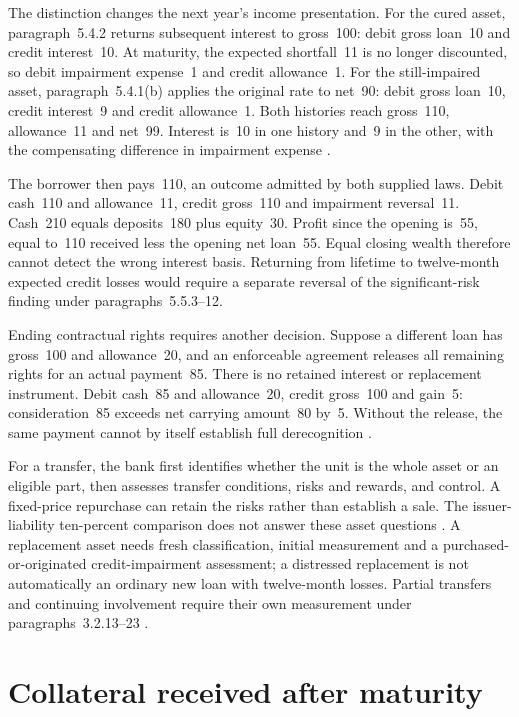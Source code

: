 The distinction changes the next year's income presentation. For the cured
asset, paragraph~5.4.2 returns subsequent interest to gross~100: debit gross
loan~10 and credit interest~10. At maturity, the expected shortfall~11 is no
longer discounted, so debit impairment expense~1 and credit allowance~1.
For the still-impaired asset, paragraph~5.4.1(b) applies the original rate to
net~90: debit gross loan~10, credit interest~9 and credit allowance~1.
Both histories reach gross~110, allowance~11 and net~99. Interest is~10 in one
history and~9 in the other, with the compensating difference in impairment
expense \citep[paragraphs~5.4.1--2]{aasb9dated}.

The borrower then pays~110, an outcome admitted by both supplied laws.
Debit cash~110 and allowance~11, credit gross~110 and impairment reversal~11.
Cash~210 equals deposits~180 plus equity~30. Profit since the opening is~55,
equal to~110 received less the opening net loan~55. Equal closing wealth
therefore cannot detect the wrong interest basis. Returning from lifetime
to twelve-month expected credit losses would require a separate reversal of
the significant-risk finding under paragraphs~5.5.3--12.

Ending contractual rights requires another decision. Suppose a different
loan has gross~100 and allowance~20, and an enforceable agreement releases
all remaining rights for an actual payment~85. There is no retained interest
or replacement instrument. Debit cash~85 and allowance~20, credit gross~100
and gain~5: consideration~85 exceeds net carrying amount~80 by~5.
Without the release, the same payment cannot by itself establish full
derecognition \citep[paragraphs~3.2.3 and~3.2.12]{aasb9dated}.

For a transfer, the bank first identifies whether the unit is the whole
asset or an eligible part, then assesses transfer conditions, risks and
rewards, and control. A fixed-price repurchase can retain the risks rather
than establish a sale. The issuer-liability ten-percent comparison does not
answer these asset questions \citep[paragraphs~3.2.2--7]{aasb9dated}.
A replacement asset needs fresh classification, initial measurement and a
purchased-or-originated credit-impairment assessment; a distressed replacement
is not automatically an ordinary new loan with twelve-month losses.
Partial transfers and continuing involvement require their own measurement
under paragraphs~3.2.13--23 \citep[B5.5.25--26]{aasb9dated}.

\section{Collateral received after maturity}\label{sec:bank-late-collateral}

